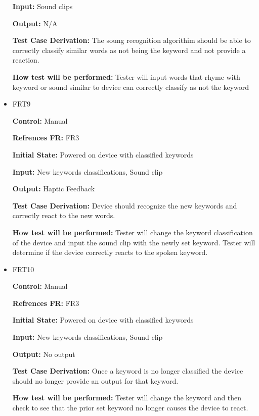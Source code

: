 \documentclass[12pt, titlepage]{article}
\begin{document}
\begin{itemize}
\textbf{Input:} Sound clips
					
\textbf{Output:} N/A

\textbf{Test Case Derivation:} The soung recognition algorithim should be able to correctly classify similar words as not being the keyword and not provide a reaction.
					
\textbf{How test will be performed:} Tester will input words that rhyme with keyword or sound similar to device can correctly classify as not the keyword


\item{FRT9}

\textbf{Control:} Manual

\textbf{Refrences FR:} FR3 					

\textbf{Initial State:} Powered on device with classified keywords 
					
\textbf{Input:} New keywords classifications, Sound clip
					
\textbf{Output:} Haptic Feedback

\textbf{Test Case Derivation:} Device should recognize the new keywords and correctly react to the new words.
					
\textbf{How test will be performed:} Tester will change the keyword classification of the device and input the sound clip with the newly set keyword. Tester will determine if the device correctly reacts to the spoken keyword.


\item{FRT10}

\textbf{Control:} Manual

\textbf{Refrences FR:} FR3 					

\textbf{Initial State:} Powered on device with classified keywords
					
\textbf{Input:} New keywords classifications, Sound clip
					
\textbf{Output:} No output

\textbf{Test Case Derivation:} Once a keyword is no longer classified the device should no longer provide an output for that keyword.
					
\textbf{How test will be performed:} Tester will change the keyword and then check to see that the prior set keyword no longer causes the device to react.


\end{itemize}
\end{document}
